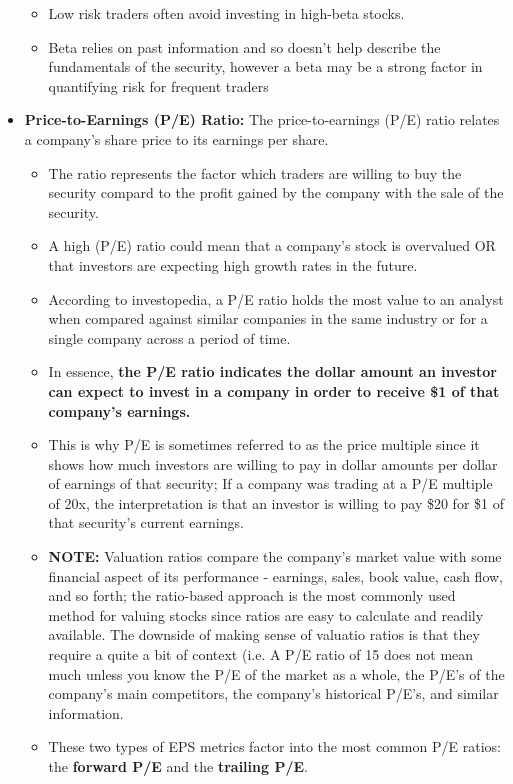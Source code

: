 \documentclass{article}
\begin{document}
\begin{itemize}
\begin{itemize}
				\item Low risk traders often avoid investing in high-beta stocks.
				\item Beta relies on past information and so doesn't help describe the fundamentals of the security, however a beta may be a strong factor in quantifying risk for frequent traders
			\end{itemize}
		\item {\bf Price-to-Earnings (P/E) Ratio:} The price-to-earnings (P/E) ratio relates a company's share price to its earnings per share.
			\begin{itemize}
				\item The ratio represents the factor which traders are willing to buy the security compard to the profit gained by the company with the sale of the security.
				\item A high (P/E) ratio could mean that a company's stock is overvalued OR that investors are expecting high growth rates in the future.
				\item According to investopedia, a P/E ratio holds the most value to an analyst when compared against similar companies in the same industry or for a single company across a period of time.
				\item In essence, {\bf the P/E ratio indicates the dollar amount an investor can expect to invest in a company in order to receive \$1 of that company's earnings.}
				\item This is why P/E is sometimes referred to as the price multiple since it shows how much investors are willing to pay in dollar amounts per dollar of earnings of that security; If a company was trading at a P/E multiple of 20x, the interpretation is that an investor is willing to pay \$20 for \$1 of that security's current earnings.
				\item {\bf NOTE:} Valuation ratios compare the company's market value with some financial aspect of its performance - earnings, sales, book value, cash flow, and so forth; the ratio-based approach is the most commonly used method for valuing stocks since ratios are easy to calculate and readily available. The downside of making sense of valuatio ratios is that they require a quite a bit of context (i.e. A P/E ratio of 15 does not mean much unless you know the P/E of the market as a whole, the P/E's of the company's main competitors, the company's historical P/E's, and similar information.
				\item These two types of EPS metrics factor into the most common P/E ratios: the {\bf forward P/E} and the {\bf trailing P/E}.

\end{itemize}
\end{itemize}
\end{document}
